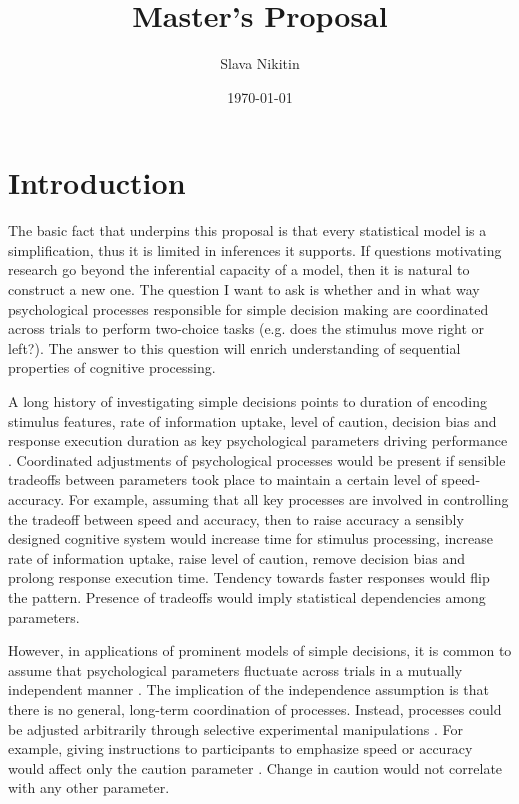 \documentclass[12pt]{article}
\title{Master's Proposal}
\author{Slava Nikitin}
\date{\today}
\begin{document}
\maketitle

\tableofcontents

\section{Introduction}
	The basic fact that underpins this proposal is that every statistical model is a simplification, thus it is limited in inferences it supports. If questions motivating research go beyond the inferential capacity of a model, then it is natural to construct a new one. The question I want to ask is whether and in what way psychological processes responsible for simple decision making are coordinated across trials to perform two-choice tasks (e.g. does the stimulus move right or left?). The answer to this question will enrich understanding of sequential properties of cognitive processing.

	A long history of investigating simple decisions points to duration of encoding stimulus features, rate of information uptake, level of caution, decision bias and response execution duration as key psychological parameters driving performance \citep{Sto1960,Vic1979,TowAsh1983,Luc1986,BogRaf2006}. Coordinated adjustments of psychological processes would be present if sensible tradeoffs between parameters took place to maintain a certain level of speed-accuracy. For example, assuming that all key processes are involved in controlling the tradeoff between speed and accuracy, then to raise accuracy a sensibly designed cognitive system would increase time for stimulus processing, increase rate of information uptake, raise level of caution, remove decision bias and prolong response execution time. Tendency towards faster responses would flip the pattern. Presence of tradeoffs would imply statistical dependencies among parameters.

	However, in applications of prominent models of simple decisions, it is common to assume that psychological parameters fluctuate across trials in a mutually independent manner \citep{RatTue2002,UshMcc2001,BroHea2008}. The implication of the independence assumption is that there is no general, long-term coordination of processes. Instead, processes could be adjusted arbitrarily through selective experimental manipulations \citep{VosAnd2004}. For example, giving instructions to participants to emphasize speed or accuracy would affect only the caution parameter \citep{RatMck2008,Wag2009,VanTue2007,VanTue2011,RaeHea2014}. Change in caution would not correlate with any other parameter.
    
\end{document}
